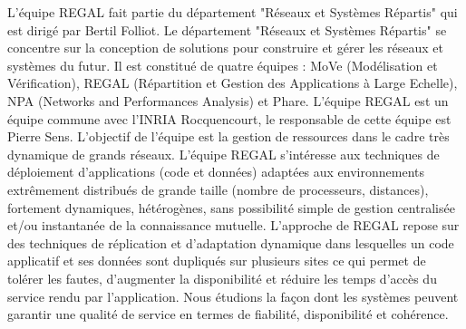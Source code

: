 	\par L'équipe REGAL fait partie du département "Réseaux et Systèmes Répartis" qui est dirigé par Bertil Folliot. Le département "Réseaux et Systèmes Répartis" se concentre sur la conception de solutions pour construire et gérer les réseaux et systèmes du futur. Il est constitué de quatre équipes : MoVe (Modélisation et Vérification), REGAL (Répartition et Gestion des Applications à Large Echelle), NPA (Networks and Performances Analysis) et Phare. L'équipe REGAL est un équipe commune avec l'INRIA Rocquencourt, le responsable de cette équipe est Pierre Sens. L'objectif de l'équipe est la gestion de ressources dans le cadre très dynamique de grands réseaux. L'équipe REGAL s'intéresse aux techniques de déploiement d'applications (code et données) adaptées aux environnements extrêmement distribués de grande taille (nombre de processeurs, distances), fortement dynamiques, hétérogènes, sans possibilité simple de gestion centralisée et/ou instantanée de la connaissance mutuelle. L'approche de REGAL repose sur des techniques de réplication et d'adaptation dynamique dans lesquelles un code applicatif et ses données sont dupliqués sur plusieurs sites ce qui permet de tolérer les fautes, d'augmenter la disponibilité et réduire les temps d'accès du service rendu par l'application. Nous étudions la façon dont les systèmes peuvent garantir une qualité de service en termes de fiabilité, disponibilité et cohérence.



